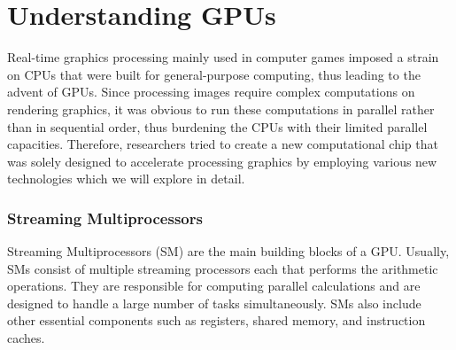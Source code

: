 \documentclass[conference]{IEEEtran}
\begin{document}
\section{Understanding GPUs}
  Real-time graphics processing mainly used in computer games imposed a strain on CPUs that were built for general-purpose computing, thus leading to the advent of GPUs. Since processing images require complex computations on rendering graphics, it was obvious to run these computations in parallel rather than in sequential order, thus burdening the CPUs with their limited parallel capacities. Therefore, researchers tried to create a new computational chip that was solely designed to accelerate processing graphics by employing various new technologies which we will explore in detail.



\subsubsection{Streaming Multiprocessors}
Streaming Multiprocessors (SM) are the main building blocks of a GPU. Usually, SMs consist of multiple streaming processors each that performs the arithmetic operations. They are responsible for computing parallel calculations and are designed to handle a large number of tasks simultaneously. SMs also include other essential components such as registers, shared memory, and instruction caches.
\cite{b1}
\end{document}
